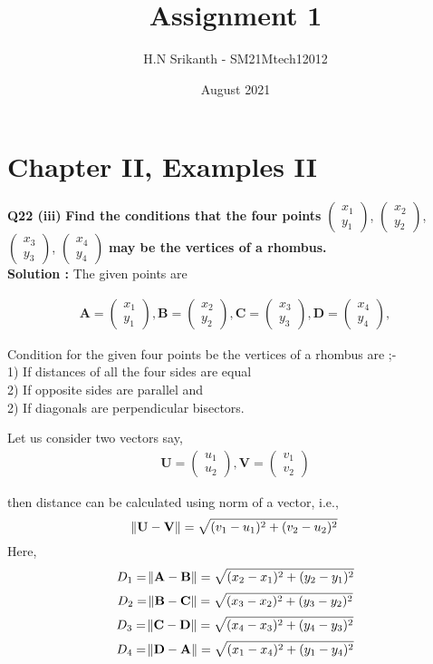 \documentclass{article}
\title{\textbf{\Huge Assignment 1}}
\author{\large H.N Srikanth - SM21Mtech12012}
\date{August 2021}
\begin{document}
\providecommand{\mbf}{\mathbf}


\newcommand{\myvec}[1]{\ensuremath{\begin{pmatrix}#1\end{pmatrix}}}
\let\vec\mathbf


\maketitle

\section*{Chapter II, Examples II}
\textbf{Q22 (iii)}
\textbf{Find the conditions that the four points}
\myvec{x_1\\y_1}, \myvec{x_2\\y_2},
\myvec{x_3\\y_3}, \myvec{x_4\\y_4}
\textbf{ may be the vertices of a rhombus.}\\

\textbf{Solution :}
\vspace{0.2cm}
 The given points are


\begin{align*}
\vec{A} = \myvec{x_1\\y_1}, \vec{B} =\myvec{x_2\\y_2},
\vec{C} =\myvec{x_3\\y_3}, \vec{D} =\myvec{x_4\\y_4},
\end{align*}


Condition for the given four points be the vertices of a rhombus are ;-\\
1) If distances of all the four sides are equal\\
2) If opposite sides are parallel and\\
2) If diagonals are perpendicular bisectors.

\vspace{0.2cm}

Let us consider two vectors say,
\begin{align*}
\vec{U} = \myvec{u_1\\u_2}, \vec{V} =\myvec{v_1\\v_2}
\end{align*} 


then distance can be calculated using norm of a vector, i.e., 
$$\norm{ \vec{U} - \vec{V}} = \sqrt{(v_1-u_1)^2+(v_2-u_2)^2}$$
Here, $$ D_1=\norm{ \vec{A} - \vec{B}} =\sqrt{(x_2-x_1)^2+(y_2-y_1)^2}$$
$$ D_2=\norm{ \vec{B} - \vec{C}} =\sqrt{(x_3-x_2)^2+(y_3-y_2)^2}$$
$$ D_3=\norm{ \vec{C} - \vec{D}} =\sqrt{(x_4-x_3)^2+(y_4-y_3)^2}$$
$$ D_4=\norm{ \vec{D} - \vec{A}} =\sqrt{(x_1-x_4)^2+(y_1-y_4)^2}$$
\end{document}
